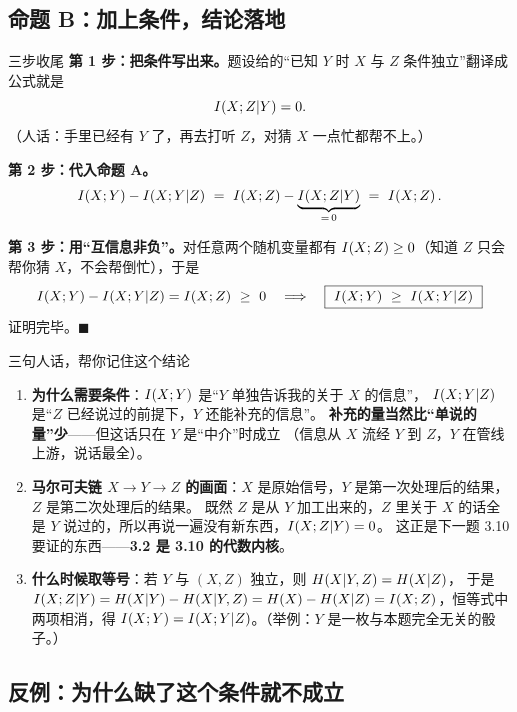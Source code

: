 \documentclass[11pt,a4paper]{ctexart}
\begin{document}
\subsection{命题 B：加上条件，结论落地}

\begin{calc}{三步收尾}
\textbf{第 1 步：把条件写出来。}题设给的“已知 $Y$ 时 $X$ 与 $Z$ 条件独立”翻译成公式就是
\[
I\!\left(X;Z|Y\right)=0 .
\]
（人话：手里已经有 $Y$ 了，再去打听 $Z$，对猜 $X$ 一点忙都帮不上。）

\textbf{第 2 步：代入命题 A。}
\[
\I{X;Y}-\I{X;Y|Z}\ =\ \I{X;Z}-\underbrace{\I{X;Z|Y}}_{=\,0}\ =\ \I{X;Z}.
\]

\textbf{第 3 步：用“互信息非负”。}对任意两个随机变量都有 $I\!\left(X;Z\right)\ge0$（知道 $Z$ 只会帮你猜 $X$，不会帮倒忙），于是
\[
I\!\left(X;Y\right)-I\!\left(X;Y|Z\right)=I\!\left(X;Z\right)\ \ge\ 0
\quad\Longrightarrow\quad
\boxed{\ I\!\left(X;Y\right)\ \ge\ I\!\left(X;Y|Z\right)\ }
\]
证明完毕。$\blacksquare$
\end{calc}

\begin{idea}{三句人话，帮你记住这个结论}
\begin{enumerate}[leftmargin=1.6em,itemsep=2pt,topsep=2pt]
  \item \textbf{为什么需要条件}：$I\!\left(X;Y\right)$ 是“$Y$ 单独告诉我的关于 $X$ 的信息”，
        $I\!\left(X;Y|Z\right)$ 是“$Z$ 已经说过的前提下，$Y$ 还能补充的信息”。
        \textbf{补充的量当然比“单说的量”少}——但这话只在 $Y$ 是“中介”时成立
        （信息从 $X$ 流经 $Y$ 到 $Z$，$Y$ 在管线上游，说话最全）。
  \item \textbf{马尔可夫链 $X\to Y\to Z$ 的画面}：$X$ 是原始信号，$Y$ 是第一次处理后的结果，$Z$ 是第二次处理后的结果。
        既然 $Z$ 是从 $Y$ 加工出来的，$Z$ 里关于 $X$ 的话全是 $Y$ 说过的，所以再说一遍没有新东西，$I\!\left(X;Z|Y\right)=0$。
        这正是下一题 3.10 要证的东西——\textbf{3.2 是 3.10 的代数内核}。
  \item \textbf{什么时候取等号}：若 $Y$ 与 $(X,Z)$ 独立，则 $H\!\left(X|Y,Z\right)=H\!\left(X|Z\right)$，
        于是 $I\!\left(X;Z|Y\right)=H\!\left(X|Y\right)-H\!\left(X|Y,Z\right)=H\!\left(X\right)-H\!\left(X|Z\right)=I\!\left(X;Z\right)$，恒等式中两项相消，得
        $I\!\left(X;Y\right)=I\!\left(X;Y|Z\right)$。（举例：$Y$ 是一枚与本题完全无关的骰子。）
\end{enumerate}
\end{idea}

\subsection{反例：为什么缺了这个条件就不成立}
\end{document}
